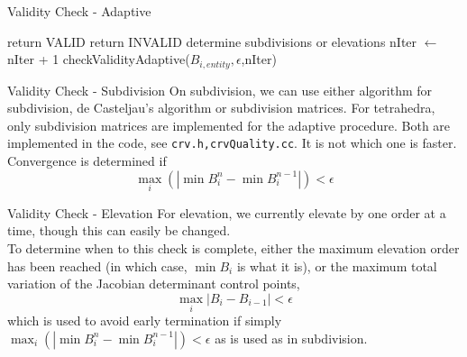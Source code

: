 \documentclass[12pt]{beamer}
\begin{document}
\begin{frame}{Validity Check - Adaptive}\scriptsize
\begin{algorithmic}[1]
\State return VALID
\State return INVALID
\Else
\State determine subdivisions or elevations
  \State nIter $\gets$ nIter + 1
  \State checkValidityAdaptive($B_{i,entity},\epsilon$,nIter)
  \EndFor
\EndIf

\EndFunction
\end{algorithmic}
\end{frame}
\begin{frame}{Validity Check - Subdivision}
On subdivision, we can use either algorithm for subdivision, de Casteljau's algorithm or subdivision matrices. For tetrahedra, only subdivision matrices are implemented for the adaptive procedure. Both are implemented in the code, see \texttt{crv.h,crvQuality.cc}. It is not which one is faster. Convergence is determined if
\[
\max_i(|\min B_i^n - \min B_i^{n-1}|) < \epsilon
\]
\end{frame}
\begin{frame}{Validity Check - Elevation}
For elevation, we currently elevate by one order at a time, though this can easily be changed. \\

To determine when to this check is complete, either the maximum elevation order has been reached (in which case, $\min B_i$ is what it is), or the maximum total variation of the Jacobian determinant control points,
\[
\max_i |B_{i}-B_{i-1}| < \epsilon
\]
which is used to avoid early termination if simply $\max_i(|\min B_i^n - \min B_i^{n-1}|) < \epsilon$  as is used as in subdivision.
\end{frame}
\end{document}
